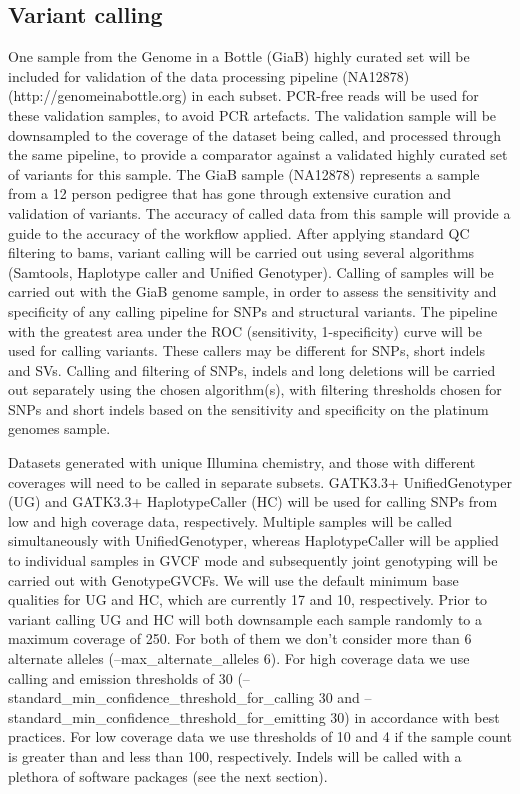 \subsection{Variant calling}
One sample from the Genome in a Bottle (GiaB) highly curated set will be included for validation of the data processing pipeline (NA12878)\cite{Zook2014} (http://genomeinabottle.org) in each subset. PCR-free reads will be used for these validation samples, to avoid PCR artefacts. The validation sample will be downsampled to the coverage of the dataset being called, and processed through the same pipeline, to provide a comparator against a validated highly curated set of variants for this sample. The GiaB sample (NA12878) represents a sample from a 12 person pedigree that has gone through extensive curation and validation of variants.\cite{Zook2014} The accuracy of called data from this sample will provide a guide to the accuracy of the workflow applied. After applying standard QC filtering to bams, variant calling will be carried out using several algorithms (Samtools, Haplotype caller and Unified Genotyper). Calling of samples will be carried out with the GiaB genome sample, in order to assess the sensitivity and specificity of any calling pipeline for SNPs and structural variants. The pipeline with the greatest area under the ROC (sensitivity, 1-specificity) curve will be used for calling variants. These callers may be different for SNPs, short indels and SVs. Calling and filtering of SNPs, indels and long deletions will be carried out separately using the chosen algorithm(s), with filtering thresholds chosen for SNPs and short indels based on the sensitivity and specificity on the platinum genomes sample.

Datasets generated with unique Illumina chemistry, and those with different coverages will need to be called in separate subsets. GATK3.3+ UnifiedGenotyper (UG) and GATK3.3+ HaplotypeCaller (HC) will be used for calling SNPs from low and high coverage data, respectively. Multiple samples will be called simultaneously with UnifiedGenotyper, whereas HaplotypeCaller will be applied to individual samples in GVCF mode and subsequently joint genotyping will be carried out with GenotypeGVCFs. We will use the default minimum base qualities for UG and HC, which are currently 17 and 10, respectively. Prior to variant calling UG and HC will both downsample each sample randomly to a maximum coverage of 250. For both of them we don't consider more than 6 alternate alleles (--max\_alternate\_alleles 6). For high coverage data we use calling and emission thresholds of 30 (--standard\_min\_confidence\_threshold\_for\_calling 30 and --standard\_min\_confidence\_threshold\_for\_emitting 30) in accordance with best practices. For low coverage data we use thresholds of 10 and 4 if the sample count is greater than and less than 100, respectively. Indels will be called with a plethora of software packages (see the next section).

